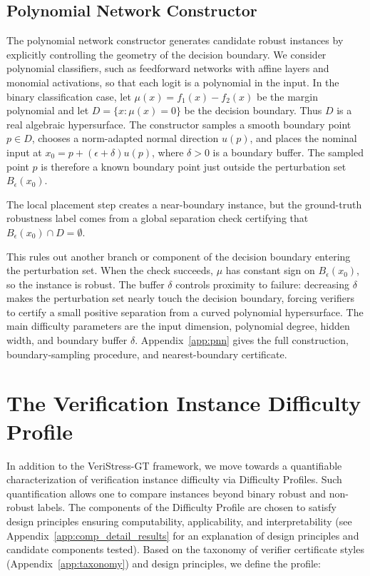 \documentclass{article}
\theoremstyle{definition}
\begin{document}
\subsection{Polynomial Network Constructor} 

The polynomial network constructor generates candidate robust instances by explicitly controlling the geometry of the decision boundary. We consider polynomial classifiers, such as feedforward networks with affine layers and monomial activations, so that each logit is a polynomial in the input. In the binary classification case, let $\mu(x)=f_1(x)-f_2(x)$ be the margin polynomial and let $D=\{x:\mu(x)=0\}$ be the decision boundary. Thus $D$ is a real algebraic hypersurface. The constructor samples a smooth boundary point $p\in D$, chooses a norm-adapted normal direction $u(p)$, %
and places the nominal input at $x_0=p+(\epsilon+\delta)u(p)$, where $\delta>0$ is a boundary buffer. The sampled point $p$ is therefore a known boundary point just outside the perturbation set $B_\epsilon(x_0)$. 

The local placement step creates a near-boundary instance, but the ground-truth robustness label comes from a global separation check %
certifying that $B_\epsilon(x_0)\cap D=\emptyset$. 

This rules out %
another branch or component of the %
decision boundary %
entering the perturbation set. 
When the check succeeds, $\mu$ has constant sign on $B_\epsilon(x_0)$, so the instance is robust. %
The buffer $\delta$ controls proximity to failure: 
decreasing $\delta$ makes the perturbation set nearly touch %
the decision boundary, forcing verifiers to certify a small positive separation from a curved polynomial hypersurface. 
The main difficulty parameters are the input dimension, polynomial degree, hidden width, and boundary buffer $\delta$. Appendix~\ref{app:pnn} gives the full construction, boundary-sampling procedure, and nearest-boundary certificate. 

\section{The Verification Instance Difficulty Profile}\label{sect:profiles}

In addition to the VeriStress-GT framework, we move towards a quantifiable characterization of verification instance difficulty via Difficulty Profiles. 
Such quantification allows one to compare instances beyond binary robust and non-robust labels. The components of the Difficulty Profile are chosen to satisfy design principles ensuring computability, applicability, and  interpretability (see Appendix~\ref{app:comp_detail_results} for an explanation of design principles and candidate components tested). 
Based on the taxonomy of verifier certificate styles (Appendix~\ref{app:taxonomy}) and design principles, we define the profile: 
\end{document}
